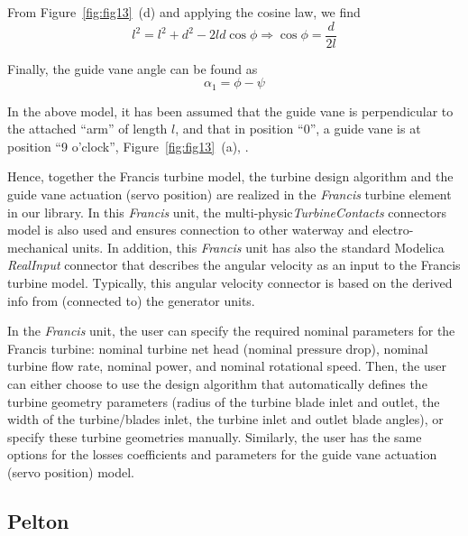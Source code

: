 \documentclass[%
]{USN-PhD}
\begin{document}
From Figure~\ref{fig:fig13}~(d) and applying the cosine law, we find
\begin{equation}
l^2=l^2+d^2-2ld\cos\phi\Rightarrow\cos\phi=\frac{d}{2l}
\end{equation}

Finally, the guide vane angle can be found as
\begin{equation}
\alpha_1=\phi-\psi
\end{equation}

In the above model, it has been assumed that the guide vane is perpendicular to the attached ``arm'' of length $l$, and that in position ``0'', a guide vane is at position ``9 o'clock'', Figure~\ref{fig:fig13}~(a), \cite{LieL:18}.

Hence, together the Francis turbine model, the turbine design algorithm and the guide vane actuation (servo position) are realized in the \emph{Francis} turbine element in our library.  In this \emph{Francis} unit, the multi-physic\emph{TurbineContacts} connectors model is also used and ensures connection to other waterway and electro-mechanical units. In addition, this \emph{Francis} unit has also the standard Modelica \emph{RealInput} connector that describes the angular velocity as an input to the Francis turbine model. Typically, this angular velocity connector is based on the derived info from (connected to) the generator units.

In the \emph{Francis} unit, the user can specify the required nominal parameters for the Francis turbine:  nominal turbine net head (nominal pressure drop), nominal turbine flow rate, nominal power, and nominal rotational speed. Then, the user can either choose to use the design algorithm that automatically defines the turbine geometry parameters (radius of the turbine blade inlet and outlet, the width of the turbine/blades inlet, the turbine inlet and outlet blade angles), or specify these turbine geometries manually. Similarly, the user has the same options for the losses coefficients and parameters for the guide vane actuation (servo position) model.

\subsection{Pelton}
\end{document}
